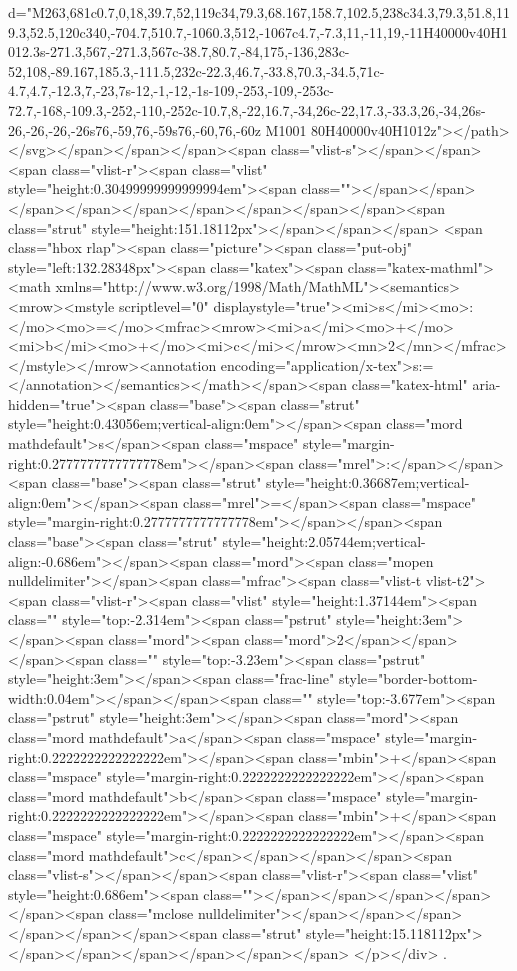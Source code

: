 d="M263,681c0.7,0,18,39.7,52,119c34,79.3,68.167,158.7,102.5,238c34.3,79.3,51.8,119.3,52.5,120c340,-704.7,510.7,-1060.3,512,-1067c4.7,-7.3,11,-11,19,-11H40000v40H1012.3s-271.3,567,-271.3,567c-38.7,80.7,-84,175,-136,283c-52,108,-89.167,185.3,-111.5,232c-22.3,46.7,-33.8,70.3,-34.5,71c-4.7,4.7,-12.3,7,-23,7s-12,-1,-12,-1s-109,-253,-109,-253c-72.7,-168,-109.3,-252,-110,-252c-10.7,8,-22,16.7,-34,26c-22,17.3,-33.3,26,-34,26s-26,-26,-26,-26s76,-59,76,-59s76,-60,76,-60z M1001 80H40000v40H1012z"></path></svg></span></span></span><span class="vlist-s">​</span></span><span class="vlist-r"><span class="vlist" style="height:0.30499999999999994em"><span class=""></span></span></span></span></span></span></span></span></span><span class="strut" style="height:151.18112px"></span></span></span>
<span class="hbox rlap"><span class="picture"><span class="put-obj" style="left:132.28348px"><span class="katex"><span class="katex-mathml"><math xmlns="http://www.w3.org/1998/Math/MathML"><semantics><mrow><mstyle scriptlevel="0" displaystyle="true"><mi>s</mi><mo>:</mo><mo>=</mo><mfrac><mrow><mi>a</mi><mo>+</mo><mi>b</mi><mo>+</mo><mi>c</mi></mrow><mn>2</mn></mfrac></mstyle></mrow><annotation encoding="application/x-tex">\displaystyle s:=</annotation></semantics></math></span><span class="katex-html" aria-hidden="true"><span class="base"><span class="strut" style="height:0.43056em;vertical-align:0em"></span><span class="mord mathdefault">s</span><span class="mspace" style="margin-right:0.2777777777777778em"></span><span class="mrel">:</span></span><span class="base"><span class="strut" style="height:0.36687em;vertical-align:0em"></span><span class="mrel">=</span><span class="mspace" style="margin-right:0.2777777777777778em"></span></span><span class="base"><span class="strut" style="height:2.05744em;vertical-align:-0.686em"></span><span class="mord"><span class="mopen nulldelimiter"></span><span class="mfrac"><span class="vlist-t vlist-t2"><span class="vlist-r"><span class="vlist" style="height:1.37144em"><span class="" style="top:-2.314em"><span class="pstrut" style="height:3em"></span><span class="mord"><span class="mord">2</span></span></span><span class="" style="top:-3.23em"><span class="pstrut" style="height:3em"></span><span class="frac-line" style="border-bottom-width:0.04em"></span></span><span class="" style="top:-3.677em"><span class="pstrut" style="height:3em"></span><span class="mord"><span class="mord mathdefault">a</span><span class="mspace" style="margin-right:0.2222222222222222em"></span><span class="mbin">+</span><span class="mspace" style="margin-right:0.2222222222222222em"></span><span class="mord mathdefault">b</span><span class="mspace" style="margin-right:0.2222222222222222em"></span><span class="mbin">+</span><span class="mspace" style="margin-right:0.2222222222222222em"></span><span class="mord mathdefault">c</span></span></span></span><span class="vlist-s">​</span></span><span class="vlist-r"><span class="vlist" style="height:0.686em"><span class=""></span></span></span></span></span><span class="mclose nulldelimiter"></span></span></span></span></span></span><span class="strut" style="height:15.118112px"></span></span></span></span></span>​ </span>
</p></div>
.